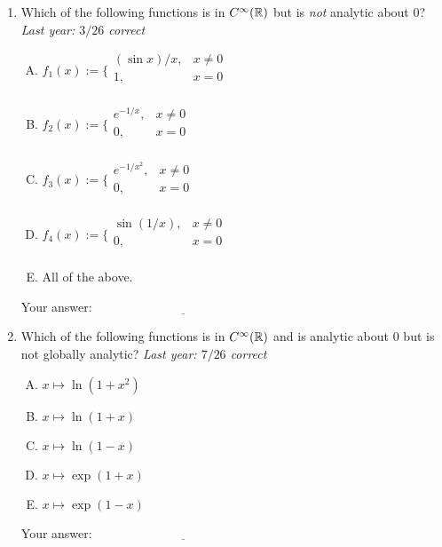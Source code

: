 \documentclass[10pt]{amsart}
\begin{document}
\begin{enumerate}
\item Which of the following functions is in $C^\infty(\mathbb{R})$ but is
  {\em not} analytic about $0$? {\em Last year: $3/26$ correct}

  \begin{enumerate}[(A)]
  \item $f_1(x) := \lbrace \begin{array}{rl} (\sin x)/x, & x \ne 0\\ 1, & x = 0 \\\end{array}$
  \item $f_2(x) := \lbrace \begin{array}{rl} e^{-1/x}, & x \ne 0\\ 0, & x = 0 \\\end{array}$
  \item $f_3(x) := \lbrace \begin{array}{rl} e^{-1/x^2}, & x \ne 0\\ 0, & x = 0 \\\end{array}$
  \item $f_4(x) := \lbrace \begin{array}{rl} \sin(1/x), & x \ne 0 \\ 0, & x = 0 \\\end{array}$
  \item All of the above.
  \end{enumerate}

  \vspace{0.1in}
  Your answer: $\underline{\qquad\qquad\qquad\qquad\qquad\qquad\qquad}$
  \vspace{0.15in}

\item Which of the following functions is in $C^\infty(\mathbb{R})$ and is
  analytic about $0$ but is not globally analytic? {\em Last year:
  $7/26$ correct}
  \begin{enumerate}[(A)]
  \item $x \mapsto \ln(1 + x^2)$
  \item $x \mapsto \ln(1 + x)$
  \item $x \mapsto \ln(1 - x)$
  \item $x \mapsto \exp(1 + x)$
  \item $x \mapsto \exp(1 - x)$
  \end{enumerate}

  \vspace{0.1in}
  Your answer: $\underline{\qquad\qquad\qquad\qquad\qquad\qquad\qquad}$
  \vspace{0.15in}


\end{enumerate}
\end{document}
